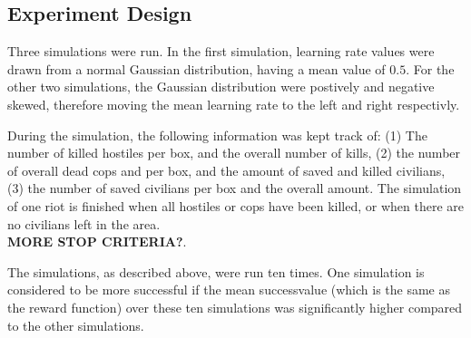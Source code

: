 \subsection{Experiment Design}
Three simulations were run. In the first simulation, learning rate values were drawn from a normal Gaussian distribution, having a mean value of $0.5$. For the other two simulations, the Gaussian distribution were postively and negative skewed, therefore moving the mean learning rate to the left and right respectivly. 

During the simulation, the following information was kept track of: (1) The number of killed hostiles per box, and the overall number of kills, (2) the number of overall dead cops and per box, and the amount of saved and killed civilians, (3) the number of saved civilians per box and the overall amount. The simulation of one riot is finished when all hostiles or cops have been killed, or when there are no civilians left in the area. \\ \textbf{MORE STOP CRITERIA?}. 
 
The simulations, as described above, were run ten times. One simulation is considered to be more successful if the mean successvalue (which is the same as the reward function) over these ten simulations was significantly higher compared to the other simulations. 
